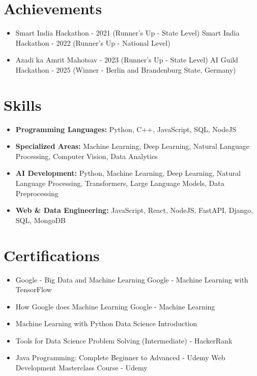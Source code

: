 \documentclass[a4paper,10pt]{article}
\begin{document}
\section*{Achievements}
\begin{itemize}
\item Smart India Hackathon - 2021 (Runner's Up - State Level) \hfill Smart India Hackathon - 2022 (Runner's Up - National Level)
\item Azadi ka Amrit Mahotsav - 2023 (Runner's Up - State Level) \hfill AI Guild Hackathon - 2025 (Winner - Berlin and Brandenburg State, Germany)
\end{itemize}

\section*{Skills}
\begin{itemize}
  \item \textbf{Programming Languages:} Python, C++, JavaScript, SQL, NodeJS
  \item \textbf{Specialized Areas:} Machine Learning, Deep Learning, Natural Language Processing, Computer Vision, Data Analytics
  \item \textbf{AI Development:} Python, Machine Learning, Deep Learning, Natural Language Processing, Transformers, Large Language Models, Data Preprocessing
  \item \textbf{Web \& Data Engineering:} JavaScript, React, NodeJS, FastAPI, Django, SQL, MongoDB
\end{itemize}

\section*{Certifications}
\begin{itemize}
\item Google - Big Data and Machine Learning \hfill Google - Machine Learning with TensorFlow
\item How Google does Machine Learning \hfill Google - Machine Learning
\item Machine Learning with Python \hfill Data Science Introduction
\item Tools for Data Science \hfill Problem Solving (Intermediate) - HackerRank
\item Java Programming: Complete Beginner to Advanced - Udemy \hfill Web Development Masterclass Course - Udemy
\end{itemize}
\end{document}
